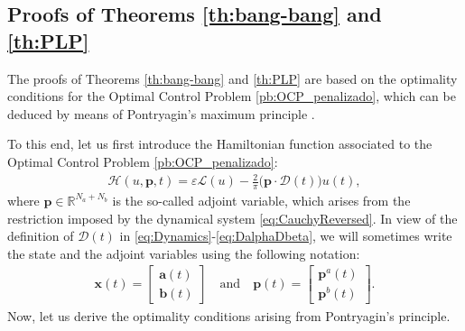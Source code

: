 \documentclass[twocolumn]{autart}    %
\begin{document}
\subsection{Proofs of Theorems \ref{th:bang-bang} and \ref{th:PLP}}

The proofs of Theorems \ref{th:bang-bang} and \ref{th:PLP} are based on the optimality conditions for the Optimal Control Problem \ref{pb:OCP_penalizado}, which can be deduced by means of Pontryagin's maximum principle \cite[Chapter~2.7]{bryson1975applied}.

To this end, let us first introduce the Hamiltonian function associated to the Optimal Control Problem \ref{pb:OCP_penalizado}:
\begin{align}\label{eq:hamil}
    \mathcal{H}(u,\bm{p},t) = \varepsilon \mathcal{L}(u) - \frac 2\pi\big(\bm{p} \cdot \bm{\mathcal{D}}(t)\big)u(t),
\end{align}
where $\bm{p}\in \mathbb{R}^{N_a+N_b}$ is the so-called adjoint variable, which arises from the restriction imposed by the dynamical system \eqref{eq:CauchyReversed}. In view of the definition of $\bm{\mathcal{D}}(t)$ in \eqref{eq:Dynamics}-\eqref{eq:DalphaDbeta}, we will sometimes write the state and the adjoint variables using the following notation:
\begin{align*}
  \bm{x}(t) = \begin{bmatrix} \bm{a}(t) \\ \bm{b}(t) \end{bmatrix} \quad \text{and}\quad
  \bm{p}(t) = \begin{bmatrix} \bm{p}^a(t) \\ \bm{p}^b(t) \end{bmatrix}.
\end{align*}
Now, let us derive the optimality conditions arising from Pontryagin's principle.
\end{document}
